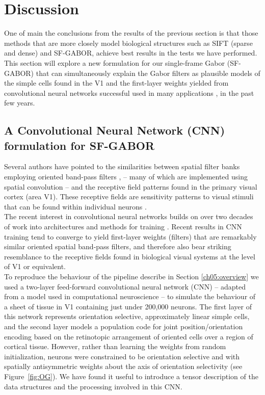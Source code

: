 \section{Discussion}

One of main the conclusions from the results of the previous section is that those methods that are more closely model biological structures such as SIFT (sparse and dense) and SF-GABOR, achieve best results in the tests we have performed. This section will explore a new formulation for our single-frame Gabor (SF-GABOR) that can simultaneously explain the Gabor filters as plausible models of the simple cells found in the V1 and the first-layer weights yielded from convolutional neural networks successful used in many applications \cite{nlp}, \cite{imagenet} in the past few years.

\subsection{A Convolutional Neural Network (CNN) formulation for SF-GABOR}


Several authors have pointed to the similarities between spatial filter banks employing oriented band-pass filters \cite{wandell1995foundations},\cite{petrou2008next} -- many of which are implemented using spatial convolution -- and the receptive field patterns found in the primary visual cortex (area V1).  These receptive fields are sensitivity patterns to visual stimuli that can be found within individual neurons \cite{olshausen1997sparse,ringach2002spatial}. \\

The recent interest in convolutional neural networks \cite{krizhevsky2012imagenet, ji20133d} builds on over two decades of work into architectures and methods for training \cite{lecun1995convolutional}. Recent results in CNN training tend to converge to yield first-layer weights (filters) that are remarkably similar oriented spatial band-pass filters, and therefore also bear striking resemblance to the receptive fields found in biological visual systems at the level of V1 or equivalent.\\

To reproduce the behaviour of the pipeline describe in Section \ref{ch05:overview} we used a two-layer feed-forward convolutional neural network (CNN) -- adapted from a model used in computational neuroscience -- to simulate the behaviour of a sheet of tissue in V1 containing just under 200,000 neurons. The first layer of this network represents orientation selective, approximately linear simple cells, and the second layer models a population code for joint position/orientation encoding based on the retinotopic arrangement of oriented cells over a region of cortical tissue.  However, rather than learning the weights from random initialization, neurons were constrained to be orientation selective and with spatially antisymmetric weights about the axis of orientation selectivity (see Figure~\ref{fig:OG}).  We have found it useful to introduce a tensor description of the data structures and the processing involved in this CNN.

